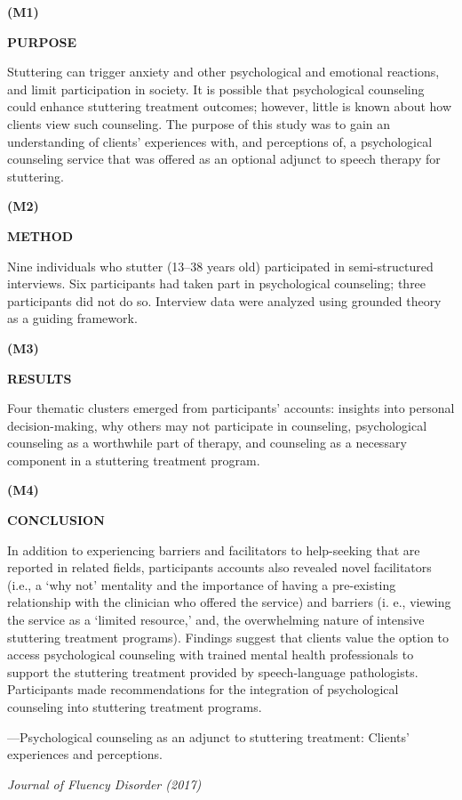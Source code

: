 \documentclass[a4paper]{ctexbook}
\begin{document}
\begin{sample}[label={myautocounter}]{\heiti}

\textbf{(M1)}

\textbf{PURPOSE }

Stuttering can trigger anxiety and other psychological and emotional reactions, and limit participation in society. It is possible that psychological counseling could enhance stuttering treatment outcomes; however, little is known about how clients view such counseling. The purpose of this study was to gain an understanding of clients' experiences with, and perceptions of, a psychological counseling service that was offered as an optional adjunct to speech therapy for stuttering.

\textbf{(M2)}

\textbf{METHOD }

Nine individuals who stutter (13--38 years old) participated in semi-structured interviews. Six participants had taken part in psychological counseling; three participants did not do so. Interview data were analyzed using grounded theory as a guiding framework.

\textbf{(M3)}

\textbf{RESULTS }

Four thematic clusters emerged from participants' accounts: insights into personal decision-making, why others may not participate in counseling, psychological counseling as a worthwhile part of therapy, and counseling as a necessary component in a stuttering treatment program.

\textbf{(M4)}

\textbf{CONCLUSION}

In addition to experiencing barriers and facilitators to help-seeking that are reported in related fields, participants accounts also revealed novel facilitators (i.e., a `why not' mentality and the importance of having a pre-existing relationship with the clinician who offered the service) and barriers (i. e., viewing the service as a `limited resource,' and, the overwhelming nature of intensive stuttering treatment programs). Findings suggest that clients value the option to access psychological counseling with trained mental health professionals to support the stuttering treatment provided by speech-language pathologists. Participants made recommendations for the integration of psychological counseling into stuttering treatment programs.

\begin{flushright}
  ---Psychological counseling as an adjunct to stuttering treatment: Clients' experiences and perceptions. 
  
  \emph{Journal of Fluency Disorder (2017)}
\end{flushright}


\end{sample}
\end{document}
